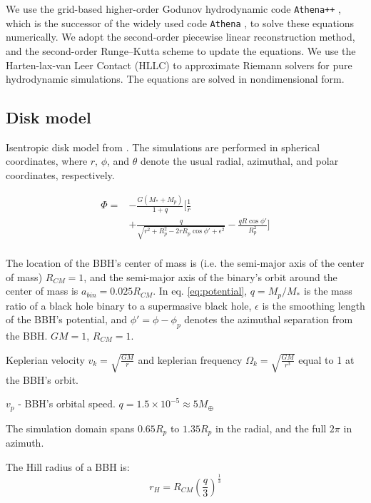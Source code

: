 \documentclass[twocolumn]{aastex631}
\begin{document}
We use the grid-based higher-order Godunov hydrodynamic code \texttt{Athena++} \citep{stone2020}, which is the successor of the 
widely used code \texttt{Athena} \citep{stone2008}, to solve these equations numerically. 
We adopt the second-order piecewise linear reconstruction method, and the second-order Runge–Kutta scheme to update the equations. 
We use the Harten-lax-van Leer Contact (HLLC) \citep{toro1994} to approximate Riemann solvers for pure hydrodynamic simulations. 
The equations are solved in nondimensional form. 

\subsection{Disk model}
Isentropic disk model from \citet{Fung_2017}.
The simulations are performed in spherical coordinates, where $r$, $\phi$, and $\theta$ denote the usual radial, azimuthal, and polar coordinates, respectively. 

\begin{equation}\label{eq:potential}
\begin{aligned}
     \Phi = & -\frac{G(M_*+M_p)}{1+q} \bigg[\frac{1}{r} \\
     & + \frac{q}{\sqrt{r^2+R_p^2-2rR_p\cos{\phi'}+\epsilon^2}} - \frac{qR\cos{\phi'}}{R_p^2}\bigg] \\
\end{aligned}
\end{equation}

The location of the BBH's center of mass is (i.e. the semi-major axis of the center of mass) $R_{CM} = 1$, and the semi-major axis of the binary's orbit around the center of mass is $a_{bin} = 0.025 R_{CM}$.
In eq. \ref{eq:potential}, $q = M_p/M_*$ is the mass ratio of a black hole binary to a supermasive black hole, $\epsilon$ is the smoothing length of the BBH's potential, and $\phi'= \phi-\phi_p$ denotes the azimuthal separation from the BBH. $GM=1$, $R_{CM}=1$.

Keplerian velocity $v_k=\sqrt{\frac{GM}{r}}$ and keplerian frequency $\Omega_k=\sqrt{\frac{GM}{r^3}}$ equal to 1 at the BBH's orbit.

$v_p$ - BBH's orbital speed. 
$q = 1.5\times 10^{-5} \approx 5 M_{\oplus}$

The simulation domain spans $0.65R_p$ to $1.35R_p$ in the radial, and the full $2\pi$ in azimuth.

The Hill radius of a BBH is:
\begin{equation}\label{eq:Hill}
    r_H=R_{CM}\left(\frac{q}{3}\right)^{\frac{1}{3}}
\end{equation}
\end{document}
